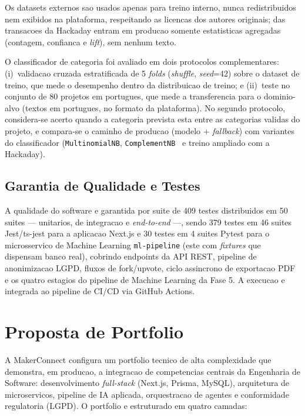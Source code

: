 \documentclass[portuguese]{sbcreviews-2025}%
\begin{document}
Os datasets externos sao usados apenas para treino interno, nunca redistribuidos nem exibidos na plataforma, respeitando as licencas dos autores originais; das transacoes da Hackaday entram em producao somente estatisticas agregadas (contagem, confianca e \textit{lift}), sem nenhum texto.

O classificador de categoria foi avaliado em dois protocolos complementares: (i)~validacao cruzada estratificada de 5 \textit{folds} (\textit{shuffle}, \textit{seed}=42) sobre o dataset de treino, que mede o desempenho dentro da distribuicao de treino; e (ii)~teste no conjunto de 80 projetos em portugues, que mede a transferencia para o dominio-alvo (textos em portugues, no formato da plataforma). No segundo protocolo, considera-se acerto quando a categoria prevista esta entre as categorias validas do projeto, e compara-se o caminho de producao (modelo + \textit{fallback}) com variantes do classificador (\texttt{MultinomialNB}, \texttt{ComplementNB}~\cite{rennie2003tackling} e treino ampliado com a Hackaday).

\subsection{Garantia de Qualidade e Testes}

A qualidade do software e garantida por suite de 409 testes distribuidos em 50 suites --- unitarios, de integracao e \textit{end-to-end} ---, sendo 379 testes em 46 suites Jest/ts-jest para a aplicacao Next.js e 30 testes em 4 suites Pytest para o microsservico de Machine Learning \texttt{ml-pipeline} (este com \textit{fixtures} que dispensam banco real), cobrindo endpoints da API REST, pipeline de anonimizacao LGPD, fluxos de fork/upvote, ciclo assincrono de exportacao PDF e os quatro estagios do pipeline de Machine Learning da Fase 5. A execucao e integrada ao pipeline de CI/CD via GitHub Actions.

\section{Proposta de Portfolio}

A MakerConnect configura um portfolio tecnico de alta complexidade que demonstra, em producao, a integracao de competencias centrais da Engenharia de Software: desenvolvimento \textit{full-stack} (Next.js, Prisma, MySQL), arquitetura de microservicos, pipeline de IA aplicada, orquestracao de agentes e conformidade regulatoria (LGPD). O portfolio e estruturado em quatro camadas:
\end{document}
